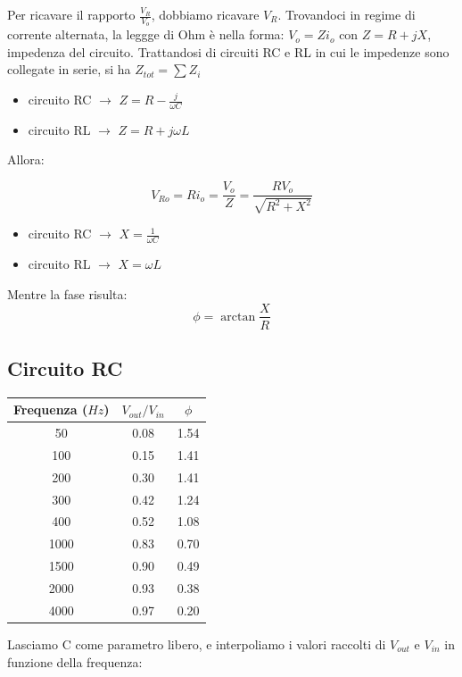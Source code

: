 Per ricavare il rapporto $\frac{V_{R}}{V_{o}}$, dobbiamo ricavare $V_R$. Trovandoci in regime di corrente alternata, la leggge di Ohm è nella forma: $ V_o = Zi_o$ con $Z = R + jX$, impedenza del circuito.
Trattandosi di circuiti RC e RL in cui le impedenze sono collegate in serie, si ha $Z_{tot} = \sum Z_i$

\begin{itemize}
\item circuito RC $\rightarrow$ $Z=R-\frac{j}{\omega C}$
\item circuito RL $\rightarrow$ $Z=R+j\omega L$
\end{itemize}  

Allora: 

$$V_{Ro} = Ri_o = \frac{V_o}{Z} = \frac{RV_o}{\sqrt{R^2+X^2}} $$ 


\begin{itemize}
\item circuito RC $\rightarrow$ $X=\frac{1}{\omega C}$
\item circuito RL $\rightarrow$ $X=\omega L$
\end{itemize}

Mentre la fase risulta: 
$$\phi = \arctan \frac{X}{R} $$


\subsection{Circuito RC}


\begin{center}

\begin{tabular}{*{3}{c}}
Frequenza ($Hz$) & $V_{out}/V_{in}$ & $\phi$ \\
\midrule
50 & 0.08 & 1.54\\
100 & 0.15 & 1.41\\
200 & 0.30 & 1.41\\
300 & 0.42 & 1.24\\
400 & 0.52 & 1.08 \\
1000 & 0.83 & 0.70\\
1500 & 0.90 & 0.49\\
2000 & 0.93 & 0.38\\
4000 & 0.97 & 0.20 \\
\end{tabular}
\end{center}

Lasciamo C come parametro libero, e interpoliamo i valori raccolti di $V_{out}$ e $V_{in}$ in funzione della frequenza:

